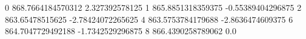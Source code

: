 0 868.7664184570312 2.327392578125
1 865.8851318359375 -0.55389404296875
2 863.65478515625 -2.78424072265625
4 863.5753784179688 -2.8636474609375
6 864.7047729492188 -1.7342529296875
8 866.4390258789062 0.0
